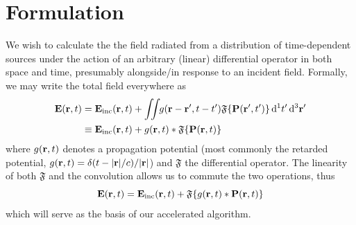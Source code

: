 \section{Formulation}

We wish to calculate the the field radiated from a distribution of time-dependent sources under the action of an arbitrary (linear) differential operator in both space and time, presumably alongside/in response to an incident field.
Formally, we may write the total field everywhere as
\begin{equation}
  \begin{aligned}
      \vb{E}(\vb{r}, t) &= \vb{E}_\text{inc}(\vb{r}, t) + \iint_{} \kern0.1em g(\vb{r} - \vb{r}', t - t') \mathfrak{F}\qty{\vb{P}(\vb{r}', t')} \dd[1]{t'} \dd[3]{\vb{r}'} \\
                        &\equiv \vb{E}_\text{inc}(\vb{r}, t) + g(\vb{r}, t) \ast \mathfrak{F}\qty{\vb{P}(\vb{r}, t)}
    \end{aligned}
  \label{eq:commuted propagator}
\end{equation}
where $g(\vb{r}, t)$ denotes a propagation potential (most commonly the retarded potential, $g(\vb{r}, t) = \delta(t - \abs{\vb{r}}/c)/\abs{\vb{r}}$) and $\mathfrak{F}$ the differential operator.
The linearity of both $\mathfrak{F}$ and the convolution allows us to commute the two operations, thus
\begin{equation}
  \vb{E}(\vb{r}, t) = \vb{E}_\text{inc}(\vb{r}, t) + \mathfrak{F}\qty{g(\vb{r}, t) \ast \vb{P}(\vb{r}, t)}
  \label{eq:propagator}
\end{equation}
which will serve as the basis of our accelerated algorithm.

